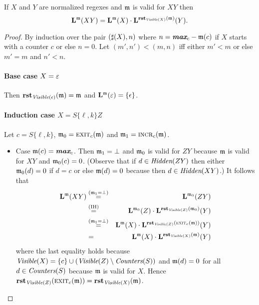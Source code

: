 \begin{lemma}
\label{lemma:RESET}
  If $X$ and $Y$ are normalized regexes and $\mem$ is valid for $XY$ then
  \em
\[
\LANG{\mem}{XY} = \LANG{\mem}{X}\cdot\LANG{\RESET{\VISIBLE{X}}(\mem)}{Y}.
\]
\end{lemma}
\begin{proof}
  By induction over the pair $(\SIZEOF{X},n)$ where $n=\MAX{c}-\mem(c)$ if $X$
  starts with a counter $c$ or else $n=0$. Let $(m',n')<(m,n)$ iff either $m' < m$
  or else $m'=m$ and $n'<n$.
 
  \paragraph{Base case $X=\emp$}
  Then $\RESET{\VISIBLE{\eps}}(\mem)=\mem$
  and $\LANG{\mem}{\emp}=\{\eps\}$.
  
  \paragraph{Induction case $X=S\{\ell,k\}Z$}
  Let $c = S\{\ell,k\}$, $\mem_0=\ExitOp[c](\mem)$ and $\mem_1=\IncrOp[c](\mem)$.

    \begin{itemize}

    \item Case $\mem(c)=\MAX{c}$.
        Then $\mem_1=\bot$ and $\mem_0$ is
  valid for $ZY$ because $\mem$ is valid for $XY$ and $\mem_0(c)=0$.
  (Observe that if $d\in\HIDDEN{ZY}$
  then either $\mem_0(d)=0$ if $d=c$ or else $\mem(d)=0$ because then
  $d\in\HIDDEN{XY}$.)
  It follows that
  \begin{eqnarray*}
    \LANG{\mem}{XY} &\stackrel{(\mem_1=\bot)}{=}& \LANG{\mem_0}{ZY} \\
    &\stackrel{\textrm{(IH)}}{=}&
    \LANG{\mem_0}{Z}\cdot\LANG{\RESET{\VISIBLE{Z}}(\mem_0)}{Y} \\
    &\stackrel{(\mem_1=\bot)}{=}&
    \LANG{\mem}{X}\cdot\LANG{\RESET{\VISIBLE{Z}}(\ExitOp[c](\mem))}{Y} \\
    &=&
    \LANG{\mem}{X}\cdot\LANG{\RESET{\VISIBLE{X}}(\mem)}{Y} 
  \end{eqnarray*}
  where the last equality holds because $\VISIBLE{X}=\{c\}\cup(\VISIBLE{Z}\setminus\COUNTERS{S})$ and
  $\mem(d)=0$ for all $d\in\COUNTERS{S}$ because $\mem$ is valid for $X$.
  Hence $\RESET{\VISIBLE{Z}}(\ExitOp[c](\mem)) = \RESET{\VISIBLE{X}}(\mem)$.
  

\end{itemize}
\end{proof}
